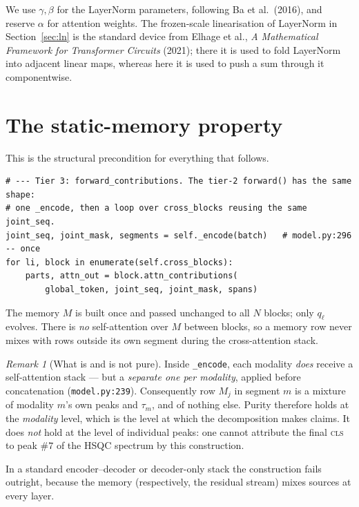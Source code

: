 \documentclass[11pt]{article}
\theoremstyle{plain}
\theoremstyle{remark}
\newtheorem*{remark}{Remark}
\newcommand{\code}[1]{\texttt{\small #1}}
\begin{document}
\medskip
\noindent
We use $\gamma,\beta$ for the LayerNorm parameters, following Ba et
al.~(2016), and reserve $\alpha$ for attention weights. The frozen-scale
linearisation of LayerNorm in Section~\ref{sec:ln} is the standard device from
Elhage et al., \emph{A Mathematical Framework for Transformer Circuits}
(2021); there it is used to fold LayerNorm into adjacent linear maps, whereas
here it is used to push a sum through it componentwise.

\section{The static-memory property}
\label{sec:static}

This is the structural precondition for everything that follows.

\begin{lstlisting}
# --- Tier 3: forward_contributions. The tier-2 forward() has the same shape:
# one _encode, then a loop over cross_blocks reusing the same joint_seq.
joint_seq, joint_mask, segments = self._encode(batch)   # model.py:296 -- once
for li, block in enumerate(self.cross_blocks):
    parts, attn_out = block.attn_contributions(
        global_token, joint_seq, joint_mask, spans)
\end{lstlisting}

\noindent
The memory $M$ is built once and passed unchanged to all $N$ blocks; only
$q_\ell$ evolves. There is \emph{no} self-attention over $M$ between blocks, so
a memory row never mixes with rows outside its own segment during the
cross-attention stack.

\begin{remark}[What is and is not pure]
Inside \code{\_encode}, each modality \emph{does} receive a self-attention
stack --- but a \emph{separate one per modality}, applied before concatenation
(\code{model.py:239}). Consequently row $M_j$ in segment $m$ is a mixture of
modality $m$'s own peaks and $\tau_m$, and of nothing else. Purity therefore
holds at the \emph{modality} level, which is the level at which the
decomposition makes claims. It does \emph{not} hold at the level of individual
peaks: one cannot attribute the final \textsc{cls} to peak $\#7$ of the HSQC
spectrum by this construction.
\end{remark}

\noindent
In a standard encoder--decoder or decoder-only stack the construction fails
outright, because the memory (respectively, the residual stream) mixes sources
at every layer.
\end{document}

